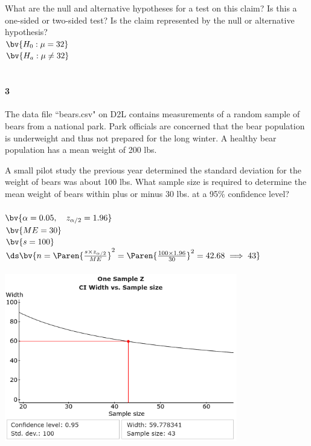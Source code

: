 \documentclass{article}
\begin{document}
\begin{flushleft}
\begin{enumalpha}
\item What are the null and alternative hypotheses for a test on this claim? Is this a one-sided or two-sided test? Is the claim represented by the null or alternative hypothesis?\\
\medskip
$\bv{H_0: \mu = 32}$\\
$\bv{H_a: \mu \ne 32}$\\
\\
\vspace{.5in}

\end{enumalpha}

\newpage
\paragraph{3} The data file ``bears.csv" on D2L contains measurements of a random sample of bears from a national park. Park officials are concerned that the bear population is underweight and thus not prepared for the long winter. A healthy bear population has a mean weight of 200 lbs.
\begin{enumalpha}
\item A small pilot study the previous year determined the standard deviation for the weight of bears was about 100 lbs. What sample size is required to determine the mean weight of bears within plus or minus 30 lbs. at a 95\% confidence level?\\
\medskip
{}\\
$\bv{\alpha = 0.05, \quad z_{\alpha/2} = 1.96}$\\
$\bv{ME = 30}$\\
$\bv{s = 100}$\\ \bigskip
$\ds \bv{n = \Paren{\frac{s \times z_{\alpha/2}}{ME}}^2 = \Paren{\frac{100 \times 1.96}{30}}^2 = 42.68 \implies 43}$\\
\vspace{0.5in}
\\
\includegraphics[width=4in]{images/grp08_Q3_a}


\end{enumalpha}
\end{flushleft}
\end{document}
